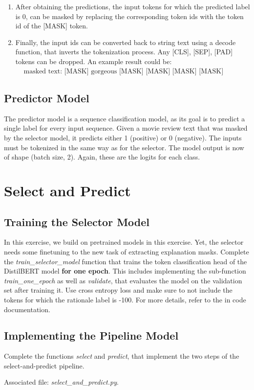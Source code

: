 \documentclass[a4paper]{article}
\begin{document}
\begin{enumerate}
    \item After obtaining the predictions, the input tokens for which the predicted label is 0, can be masked by replacing the corresponding token ids with the token id of the [MASK] token.
    
    \item Finally, the input ids can be converted back to string text using a decode function, that inverts the tokenization process.
    Any [CLS], [SEP], [PAD] tokens can be dropped.
    An example result could be:
    \begin{align*}
    &\text{masked text: [MASK] gorgeous [MASK] [MASK] [MASK] [MASK] [MASK] [MASK] [MASK]}
    \end{align*}
    
\end{enumerate}

 
 
\subsection*{Predictor Model}
 The predictor model is a sequence classification model, as its goal is to predict a single label for every input sequence.
 Given a movie review text that was masked by the selector model, it predicts either 1 (positive) or 0 (negative).
 The inputs must be tokenized in the same way as for the selector.
 The model output is now of shape (batch size, 2).
 Again, these are the logits for each class.
 




\section{Select and Predict}

\subsection{Training the Selector Model}
In this exercise, we build on pretrained models in this exercise.
Yet, the selector needs some finetuning to the new task of extracting explanation masks.
Complete the \textit{train\_selector\_model} function that trains the token classification head of the DistilBERT model \textbf{for one epoch}.
This includes implementing the sub-function \textit{train\_one\_epoch} as well as \textit{validate}, that evaluates the model on the validation set after training it.
Use cross entropy loss and make sure to not include the tokens for which the rationale label is -100.
For more details, refer to the in code documentation.

\subsection{Implementing the Pipeline Model}
Complete the functions \textit{select} and \textit{predict}, that implement the two steps of the select-and-predict pipeline.

\noindent Associated file: \textit{select\_and\_predict.py}.
\end{document}
